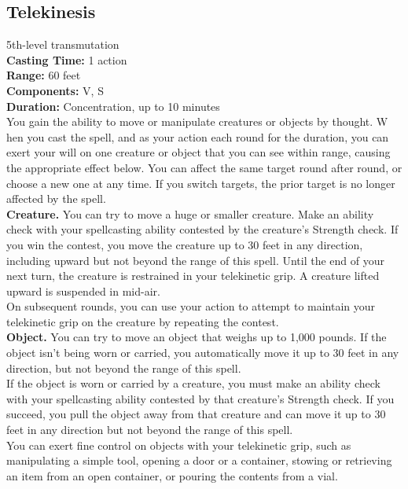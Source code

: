 \documentclass[11pt, A4paper, english]{article}
\begin{document}
		\subsection{Telekinesis}
5th-level transmutation \\
\textbf{Casting Time:} 1 action \\
\textbf{Range:} 60 feet \\
\textbf{Components:} V, S \\
\textbf{Duration:} Concentration, up to 10 minutes \\
You gain the ability to move or manipulate creatures or objects by thought. W hen you cast the spell, and as your action each round for the duration, you can exert your will on one creature or object that you can see within range, causing the appropriate effect below. You can affect the same target round after round, or choose a new one at any time. If you switch targets, the prior target is no longer affected by the spell. \\
\textbf{Creature.} You can try to move a huge or smaller creature. Make an ability check with your spellcasting ability contested by the creature’s Strength check. If you win the contest, you move the creature up to 30 feet in any direction, including upward but not beyond the range of this spell. Until the end of your next turn, the creature is restrained in your telekinetic grip. A creature lifted upward is suspended in mid-air. \\
On subsequent rounds, you can use your action to attempt to maintain your telekinetic grip on the creature by repeating the contest. \\
\textbf{Object.} You can try to move an object that weighs up to 1,000 pounds. If the object isn’t being worn or carried, you automatically move it up to 30 feet in any direction, but not beyond the range of this spell. \\
If the object is worn or carried by a creature, you must make an ability check with your spellcasting ability contested by that creature’s Strength check. If you succeed, you pull the object away from that creature and can move it up to 30 feet in any direction but not beyond the range of this spell. \\
You can exert fine control on objects with your telekinetic grip, such as manipulating a simple tool, opening a door or a container, stowing or retrieving an item from an open container, or pouring the contents from a vial.
\end{document}
